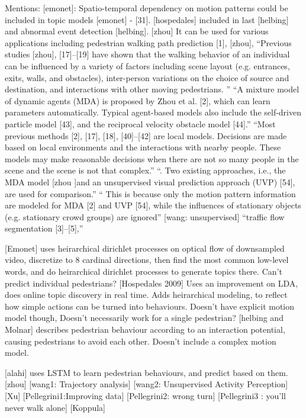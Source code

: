 \documentclass[usenames,dvipsnames]{article}
\begin{document}
\begin{enumerate}
	Mentions:
	[emonet]: Spatio-temporal dependency on motion patterns could be
	included in topic models [emonet] - [31].
	[hospedales] included in last
	[helbing] and abnormal event detection [helbing].
	[zhou] It can be used for various applications
	including pedestrian walking path prediction [1], [zhou],
	``Previous studies [zhou], [17]–[19] have shown that the walking
	behavior of an individual can be influenced by a variety
	of factors including scene layout (e.g. entrances, exits,
	walls, and obstacles), inter-person variations on the choice
	of source and destination, and interactions with other moving
	pedestrians. ''
	``A mixture model of dynamic
	agents (MDA) is proposed by Zhou et al. [2], which can learn
	parameters automatically. Typical agent-based models also
	include the self-driven particle model [43], and the reciprocal
	velocity obstacle model [44].''
	``Most previous methods [2], [17], [18], [40]–[42] are local
	models. Decisions are made based on local environments and
	the interactions with nearby people. These models may make
	reasonable decisions when there are not so many people in
	the scene and the scene is not that complex.''
	``. Two existing approaches,
	i.e., the MDA model [zhou ]and an unsupervised visual prediction
	approach (UVP) [54], are used for comparison.''
	`` This is because only the motion pattern
	information are modeled for MDA [2] and UVP [54], while the
	influences of stationary objects (e.g. stationary crowd groups)
	are ignored''
	[wang: unsupervised] ``traffic
	flow segmentation [3]–[5],''
	
	
	
		
	[Emonet] uses heirarchical dirichlet processes on optical flow of downsampled video, discretize to 8 cardinal directions, then find the most common low-level words, and do heirarchical dirichlet processes to generate topics there. Can't predict individual pedestrians?
	[Hospedales 2009] Uses an improvement on LDA, does online topic discovery in real time. Adds heirarchical modeling, to reflect how simple actions can be turned into behaviours. Doesn't have explicit motion model though, Doesn't necessarily work for a single pedestrian?
	[helbing and Molnar] describes pedestrian behaviour according to an interaction potential, causing pedestrians to avoid each other. Doesn't include a complex motion model. 
	
	[alahi]  uses LSTM to learn pedestrian behaviours, and predict based on them.
	[zhou] 
	[wang1: Trajectory analysis]
	[wang2: Unsupervised Activity Perception]
	[Xu]
	[Pellegrini1:Improving data]
	[Pellegrini2: wrong turn]
	[Pellegrini3 : you'll never walk alone]
	[Koppula]
	


\end{enumerate}
\end{document}
